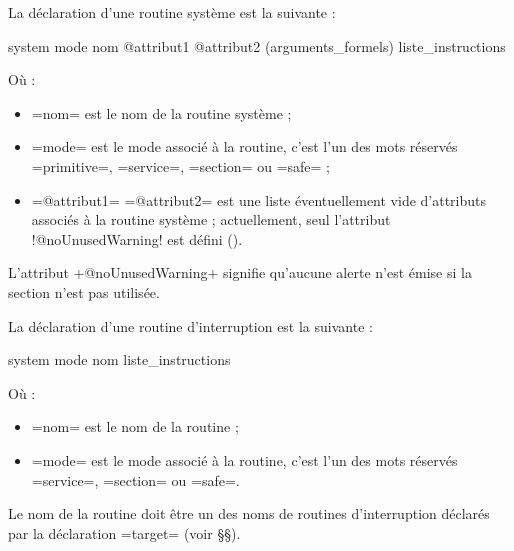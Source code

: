 La déclaration d'une routine système est la suivante :
\begin{PLM}
system mode nom @attribut1 @attribut2 (arguments_formels) {
  liste_instructions
}
\end{PLM}
Où :
\begin{itemize}
  \item \plm=nom= est le nom de la routine système ;
  \item \plm=mode= est le mode associé à la routine, c'est l'un des mots réservés \plm=primitive=, \plm=service=, \plm=section= ou \plm=safe= ;
  \item \plm=@attribut1= \plm=@attribut2= est une liste éventuellement vide d'attributs associés à la routine système ; actuellement, seul l'attribut \plm!@noUnusedWarning! est défini ().
\end{itemize}











L'attribut \plm+@noUnusedWarning+ signifie qu'aucune alerte n'est émise si la section n'est pas utilisée.





















La déclaration d'une routine d'interruption est la suivante :
\begin{PLM}
system mode nom {
  liste_instructions
}
\end{PLM}
Où :
\begin{itemize}
  \item \plm=nom= est le nom de la routine ;
  \item \plm=mode= est le mode associé à la routine, c'est l'un des mots réservés \plm=service=, \plm=section= ou \plm=safe=.
\end{itemize}

Le nom de la routine doit être un des noms de routines d'interruption déclarés par la déclaration \plm=target= (voir §§).


